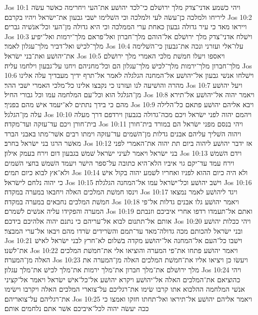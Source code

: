 Jos 10:1  ויהי כשׁמע אדני־צדק מלך ירושׁלם כי־לכד יהושׁע את־העי ויחרימה כאשׁר עשׂה ליריחו ולמלכה כן־עשׂה לעי ולמלכה וכי השׁלימו ישׁבי גבעון את־ישׂראל ויהיו בקרבם׃
Jos 10:2  וייראו מאד כי עיר גדולה גבעון כאחת ערי הממלכה וכי היא גדולה מן־העי וכל־אנשׁיה גברים׃
Jos 10:3  וישׁלח אדני־צדק מלך ירושׁלם אל־הוהם מלך־חברון ואל־פראם מלך־ירמות ואל־יפיע מלך־לכישׁ ואל־דביר מלך־עגלון לאמר׃
Jos 10:4  עלו־אלי ועזרני ונכה את־גבעון כי־השׁלימה את־יהושׁע ואת־בני ישׂראל׃
Jos 10:5  ויאספו ויעלו חמשׁת מלכי האמרי מלך ירושׁלם מלך־חברון מלך־ירמות מלך־לכישׁ מלך־עגלון הם וכל־מחניהם ויחנו על־גבעון וילחמו עליה׃
Jos 10:6  וישׁלחו אנשׁי גבעון אל־יהושׁע אל־המחנה הגלגלה לאמר אל־תרף ידיך מעבדיך עלה אלינו מהרה והושׁיעה לנו ועזרנו כי נקבצו אלינו כל־מלכי האמרי ישׁבי ההר׃
Jos 10:7  ויעל יהושׁע מן־הגלגל הוא וכל־עם המלחמה עמו וכל גבורי החיל׃
Jos 10:8  ויאמר יהוה אל־יהושׁע אל־תירא מהם כי בידך נתתים לא־יעמד אישׁ מהם בפניך׃
Jos 10:9  ויבא אליהם יהושׁע פתאם כל־הלילה עלה מן־הגלגל׃
Jos 10:10  ויהמם יהוה לפני ישׂראל ויכם מכה־גדולה בגבעון וירדפם דרך מעלה בית־חורן ויכם עד־עזקה ועד־מקדה׃
Jos 10:11  ויהי בנסם מפני ישׂראל הם במורד בית־חורן ויהוה השׁליך עליהם אבנים גדלות מן־השׁמים עד־עזקה וימתו רבים אשׁר־מתו באבני הברד מאשׁר הרגו בני ישׂראל בחרב׃
Jos 10:12  אז ידבר יהושׁע ליהוה ביום תת יהוה את־האמרי לפני בני ישׂראל ויאמר לעיני ישׂראל שׁמשׁ בגבעון דום וירח בעמק אילון׃
Jos 10:13  וידם השׁמשׁ וירח עמד עד־יקם גוי איביו הלא־היא כתובה על־ספר הישׁר ויעמד השׁמשׁ בחצי השׁמים ולא־אץ לבוא כיום תמים׃
Jos 10:14  ולא היה כיום ההוא לפניו ואחריו לשׁמע יהוה בקול אישׁ כי יהוה נלחם לישׂראל׃
Jos 10:15  וישׁב יהושׁע וכל־ישׂראל עמו אל־המחנה הגלגלה׃
Jos 10:16  וינסו חמשׁת המלכים האלה ויחבאו במערה במקדה׃
Jos 10:17  ויגד ליהושׁע לאמר נמצאו חמשׁת המלכים נחבאים במערה במקדה׃
Jos 10:18  ויאמר יהושׁע גלו אבנים גדלות אל־פי המערה והפקידו עליה אנשׁים לשׁמרם׃
Jos 10:19  ואתם אל־תעמדו רדפו אחרי איביכם וזנבתם אותם אל־תתנום לבוא אל־עריהם כי נתנם יהוה אלהיכם בידכם׃
Jos 10:20  ויהי ככלות יהושׁע ובני ישׂראל להכותם מכה גדולה־מאד עד־תמם והשׂרידים שׂרדו מהם ויבאו אל־ערי המבצר׃
Jos 10:21  וישׁבו כל־העם אל־המחנה אל־יהושׁע מקדה בשׁלום לא־חרץ לבני ישׂראל לאישׁ את־לשׁנו׃
Jos 10:22  ויאמר יהושׁע פתחו את־פי המערה והוציאו אלי את־חמשׁת המלכים האלה מן־המערה׃
Jos 10:23  ויעשׂו כן ויציאו אליו את־חמשׁת המלכים האלה מן־המערה את מלך ירושׁלם את־מלך חברון את־מלך ירמות את־מלך לכישׁ את־מלך עגלון׃
Jos 10:24  ויהי כהוציאם את־המלכים האלה אל־יהושׁע ויקרא יהושׁע אל־כל־אישׁ ישׂראל ויאמר אל־קציני אנשׁי המלחמה ההלכוא אתו קרבו שׂימו את־רגליכם על־צוארי המלכים האלה ויקרבו וישׂימו את־רגליהם על־צואריהם׃
Jos 10:25  ויאמר אליהם יהושׁע אל־תיראו ואל־תחתו חזקו ואמצו כי ככה יעשׂה יהוה לכל־איביכם אשׁר אתם נלחמים אותם׃
